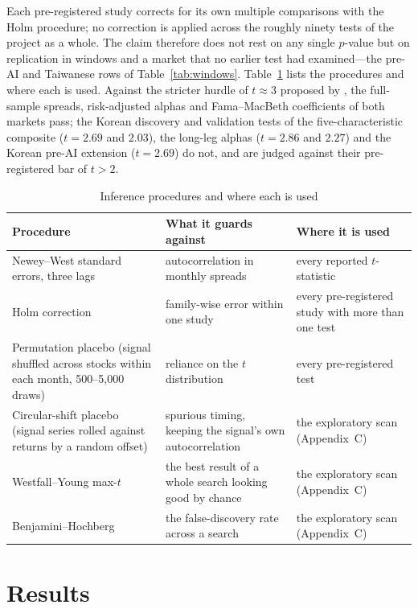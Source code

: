 \documentclass[12pt,a4paper]{article}
\begin{document}
Each pre-registered study corrects for its own multiple comparisons with the Holm procedure; no
correction is applied across the roughly ninety tests of the project as a whole. The claim therefore does not rest on
any single $p$-value but on replication in windows and a market that no earlier test had examined---the pre-AI and
Taiwanese rows of Table~\ref{tab:windows}. Table~\ref{tab:inference} lists the procedures and where each is used. Against the
stricter hurdle of $t\approx3$ proposed by \citet{harvey2016}, the full-sample spreads, risk-adjusted alphas and
Fama--MacBeth coefficients of both markets pass; the Korean discovery and validation tests of the five-characteristic
composite ($t=2.69$ and $2.03$), the long-leg alphas ($t=2.86$ and $2.27$) and the Korean pre-AI extension ($t=2.69$) do
not, and are judged against their pre-registered bar of $t>2$.

\begin{table}[htbp]
\centering
\caption{Inference procedures and where each is used}
\label{tab:inference}
\footnotesize
\begin{tabularx}{\textwidth}{@{}>{\raggedright\arraybackslash}p{4.6cm} >{\raggedright\arraybackslash}X >{\raggedright\arraybackslash}p{4.2cm}@{}}
\toprule
Procedure & What it guards against & Where it is used \\
\midrule
Newey--West standard errors, three lags & autocorrelation in monthly spreads & every reported $t$-statistic \\
Holm correction & family-wise error within one study & every pre-registered study with more than one test \\
Permutation placebo (signal shuffled across stocks within each month, 500--5{,}000 draws) & reliance on the $t$
distribution & every pre-registered test \\
Circular-shift placebo (signal series rolled against returns by a random offset) & spurious timing, keeping the
signal's own autocorrelation & the exploratory scan (Appendix~C) \\
Westfall--Young max-$t$ & the best result of a whole search looking good by chance & the exploratory scan
(Appendix~C) \\
Benjamini--Hochberg & the false-discovery rate across a search & the exploratory scan (Appendix~C) \\
\bottomrule
\end{tabularx}
\end{table}

\section{Results}\label{sec:results}
\end{document}
